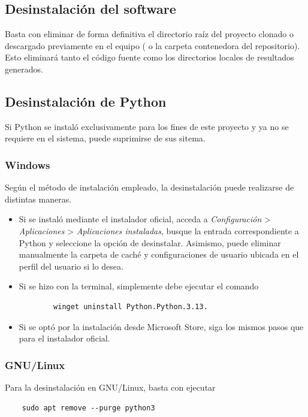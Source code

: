 \documentclass[a4paper,12pt,twoside,final]{book}
\begin{document}
\subsection{Desinstalación del software}
Basta con eliminar de forma definitiva el directorio raíz del proyecto clonado o descargado previamente en el equipo
( o la carpeta contenedora del repositorio). Esto eliminará tanto el código fuente como los directorios
locales de resultados generados.

\subsection{Desinstalación de Python}
Si Python se instaló exclusivamente para los fines de este proyecto y ya no se requiere en el sistema, puede suprimirse
de sus sitema.

\subsubsection{Windows}
Según el método de instalación empleado, la desinstalación puede realizarse de distintas maneras.
\begin{itemize}
    \item Si se instaló mediante el instalador oficial, acceda a \textit{Configuración} > \textit{Aplicaciones} >
    \textit{Aplicaciones instaladas}, busque la entrada correspondiente a Python y seleccione la opción de desinstalar.
    Asimismo, puede eliminar manualmente la carpeta de caché y configuraciones de usuario ubicada en el perfil del
    usuario si lo desea.
    \item Si se hizo con la terminal, simplemente debe ejecutar el comando
    \begin{verbatim}
        winget uninstall Python.Python.3.13.
    \end{verbatim}
        
    \item Si se optó por la instalación desde Microsoft Store, siga los mismos pasos que para el instalador oficial.
\end{itemize}

\subsubsection{GNU/Linux}
Para la desinstalación en GNU/Linux, basta con ejecutar
\begin{verbatim}
    sudo apt remove --purge python3    
\end{verbatim}
\end{document}
